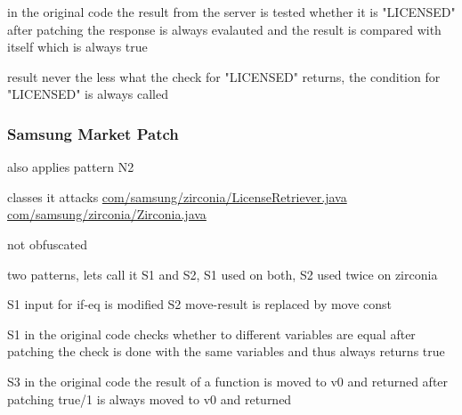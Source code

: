 in the original code the result from the server is tested whether it is "LICENSED"
after patching the response is always evalauted and the result is compared with itself which is always true

result
never the less what the check for "LICENSED" returns, the condition for "LICENSED" is always called
\subsubsection{Samsung Market Patch}
also applies pattern N2

classes it attacks %
\url{com/samsung/zirconia/LicenseRetriever.java}
\url{com/samsung/zirconia/Zirconia.java}

not obfuscated

two patterns, lets call it S1 and S2, S1 used on both, S2 used twice on zirconia



S1
input for if-eq is modified
S2
move-result is replaced by move const


S1
in the original code checks whether to different variables are equal
after patching the check is done with the same variables and thus always returns true

S3
in the original code the result of a function is moved to v0 and returned
after patching true/1 is always moved to v0 and returned



